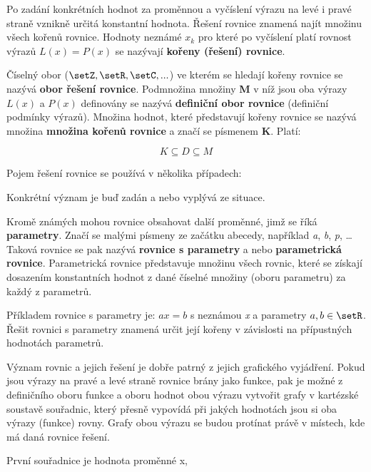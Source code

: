 Po zadání konkrétních hodnot za proměnnou a vyčíslení výrazu na levé i pravé straně vznikně určitá konstantní hodnota. Řešení rovnice znamená najít množinu všech kořenů rovnice. Hodnoty neznámé $x_k$ pro které po vyčíslení platí rovnost výrazů $L(x) = P(x)$ se nazývají {\bf kořeny (řešení) rovnice}.

Číselný obor ($\setZ,\setR,\setC, ...$) ve kterém se hledají kořeny rovnice se nazývá {\bf obor řešení rovnice}. Podmnožina množiny {\bf M} v níž jsou oba výrazy $L(x)$ a $P(x)$ definovány se nazývá {\bf definiční obor rovnice} (definiční podmínky výrazů). Množina hodnot, které představují kořeny rovnice se nazývá množina {\bf množina kořenů rovnice} a značí se písmenem {\bf K}. Platí:

$$ K \subseteq D \subseteq M $$

Pojem řešení rovnice se používá v několika případech:

\vskip 4mm
\vskip 4mm

Konkrétní význam je buď zadán a nebo vyplývá ze situace.


Kromě známých mohou rovnice obsahovat další proměnné, jimž se říká {\bf parametry}. Značí se malými písmeny ze začátku abecedy, například {\it a}, {\it b}, {\it p}, … Taková rovnice se pak nazývá {\bf rovnice s parametry} a nebo  {\bf parametrická rovnice}. Parametrická rovnice představuje množinu všech rovnic, které se získají dosazením konstantních hodnot z dané číselné množiny (oboru parametru) za každý z parametrů.

Příkladem rovnice s parametry je: $ax = b$ s neznámou {\it x} a parametry $a, b \in \setR$. Řešit rovnici s parametry znamená určit její kořeny v závislosti na přípustných hodnotách parametrů.


Význam rovnic a jejich řešení je dobře patrný z jejich grafického vyjádření. Pokud jsou výrazy na pravé a levé straně rovnice brány jako funkce, pak je možné z definičního oboru funkce a oboru hodnot obou výrazu vytvořit grafy v kartézské soustavě souřadnic, který přesně vypovídá při jakých hodnotách jsou si oba výrazy (funkce) rovny. Grafy obou výrazu se budou protínat právě v místech, kde má daná rovnice řešení. 

\vskip 4mm
\centerline{}
\vskip 4mm

První souřadnice je hodnota proměnné x,

